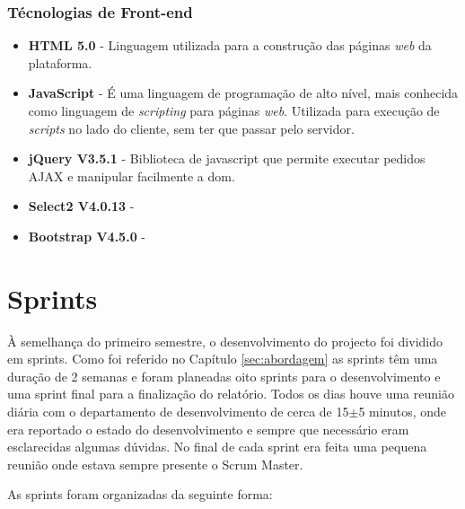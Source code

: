 \subsubsection{Técnologias de Front-end}
\begin{itemize}
	\item \textbf{HTML 5.0} - Linguagem utilizada para a construção das páginas \textit{web} da plataforma.
	\item \textbf{JavaScript} - É uma linguagem de programação de alto nível, mais conhecida como linguagem de \textit{scripting} para páginas \textit{web}. Utilizada para execução de \textit{scripts} no lado do cliente, sem ter que passar pelo servidor.
	\item \textbf{jQuery V3.5.1} - Biblioteca de javascript que permite executar pedidos AJAX e manipular facilmente a \acrfull{dom}. 
	\item \textbf{Select2 V4.0.13} - 
	\item \textbf{Bootstrap V4.5.0} - 
\end{itemize}


\section{Sprints}
\label{sec:sprints}

À semelhança do primeiro semestre, o desenvolvimento do projecto foi dividido em sprints. Como foi referido no Capítulo \ref{sec:abordagem} as sprints têm uma duração de 2 semanas e foram planeadas oito sprints para o desenvolvimento e uma sprint final para a finalização do relatório. Todos os dias houve uma reunião diária com o departamento de desenvolvimento de cerca de 15$\pm$5 minutos, onde era reportado o estado do desenvolvimento e sempre que necessário eram esclarecidas algumas dúvidas. No final de cada sprint era feita uma pequena reunião onde estava sempre presente o Scrum Master.

As sprints foram organizadas da seguinte forma:



